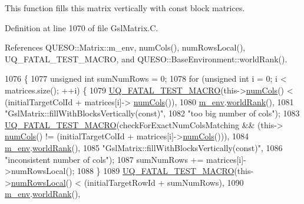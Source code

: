 This function fills {\ttfamily this} matrix vertically with const block matrices. 



Definition at line 1070 of file Gsl\-Matrix.\-C.



References Q\-U\-E\-S\-O\-::\-Matrix\-::m\-\_\-env, num\-Cols(), num\-Rows\-Local(), U\-Q\-\_\-\-F\-A\-T\-A\-L\-\_\-\-T\-E\-S\-T\-\_\-\-M\-A\-C\-R\-O, and Q\-U\-E\-S\-O\-::\-Base\-Environment\-::world\-Rank().


\begin{DoxyCode}
1076 \{
1077   \textcolor{keywordtype}{unsigned} \textcolor{keywordtype}{int} sumNumRows = 0;
1078   \textcolor{keywordflow}{for} (\textcolor{keywordtype}{unsigned} \textcolor{keywordtype}{int} i = 0; i < matrices.size(); ++i) \{
1079     \hyperlink{_defines_8h_a56d63d18d0a6d45757de47fcc06f574d}{UQ\_FATAL\_TEST\_MACRO}(this->\hyperlink{class_q_u_e_s_o_1_1_gsl_matrix_ad5005f168fe030468e834776afb1859b}{numCols}() < (initialTargetColId + matrices[i]->
      \hyperlink{class_q_u_e_s_o_1_1_gsl_matrix_ad5005f168fe030468e834776afb1859b}{numCols}()),
1080                         \hyperlink{class_q_u_e_s_o_1_1_matrix_a247fb0fc0b87fecdee054bb4660b68e8}{m\_env}.\hyperlink{class_q_u_e_s_o_1_1_base_environment_a78b57112bbd0e6dd0e8afec00b40ffa7}{worldRank}(),
1081                         \textcolor{stringliteral}{"GslMatrix::fillWithBlocksVertically(const)"},
1082                         \textcolor{stringliteral}{"too big number of cols"});
1083     \hyperlink{_defines_8h_a56d63d18d0a6d45757de47fcc06f574d}{UQ\_FATAL\_TEST\_MACRO}(checkForExactNumColsMatching && (this->
      \hyperlink{class_q_u_e_s_o_1_1_gsl_matrix_ad5005f168fe030468e834776afb1859b}{numCols}() != (initialTargetColId + matrices[i]->\hyperlink{class_q_u_e_s_o_1_1_gsl_matrix_ad5005f168fe030468e834776afb1859b}{numCols}())),
1084                         \hyperlink{class_q_u_e_s_o_1_1_matrix_a247fb0fc0b87fecdee054bb4660b68e8}{m\_env}.\hyperlink{class_q_u_e_s_o_1_1_base_environment_a78b57112bbd0e6dd0e8afec00b40ffa7}{worldRank}(),
1085                         \textcolor{stringliteral}{"GslMatrix::fillWithBlocksVertically(const)"},
1086                         \textcolor{stringliteral}{"inconsistent number of cols"});
1087     sumNumRows += matrices[i]->numRowsLocal();
1088   \}
1089   \hyperlink{_defines_8h_a56d63d18d0a6d45757de47fcc06f574d}{UQ\_FATAL\_TEST\_MACRO}(this->\hyperlink{class_q_u_e_s_o_1_1_gsl_matrix_ab5ec937a9fd439eef1a87e12c0dbccb4}{numRowsLocal}() < (initialTargetRowId + 
      sumNumRows),
1090                       \hyperlink{class_q_u_e_s_o_1_1_matrix_a247fb0fc0b87fecdee054bb4660b68e8}{m\_env}.\hyperlink{class_q_u_e_s_o_1_1_base_environment_a78b57112bbd0e6dd0e8afec00b40ffa7}{worldRank}(),

\end{DoxyCode}

